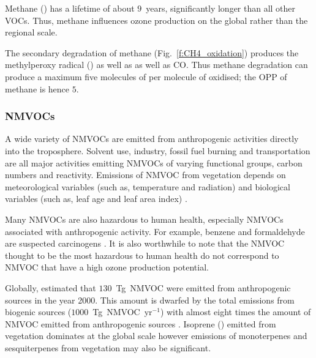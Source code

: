 Methane () has a lifetime of about $9$~years, significantly longer than all other VOCs.
Thus, methane influences ozone production on the global rather than the regional scale.  

The secondary degradation of methane (Fig.~\ref{f:CH4_oxidation}) produces the methylperoxy radical () as well as  as well as CO.
Thus methane degradation can produce a maximum five molecules of  per molecule of  oxidised; the OPP of methane is hence $5$.

\subsubsection{NMVOCs}
A wide variety of NMVOCs are emitted from anthropogenic activities directly into the troposphere.
Solvent use, industry, fossil fuel burning and transportation are all major activities emitting NMVOCs of varying functional groups, carbon numbers and reactivity.
Emissions of NMVOC from vegetation depends on meteorological variables (such as, temperature and radiation) and biological variables (such as, leaf age and leaf area index) \citep{Guenther:2012}.

Many NMVOCs are also hazardous to human health, especially NMVOCs associated with anthropogenic activity.
For example, benzene and formaldehyde are suspected carcinogens \citep{Laurent:2014}.
It is also worthwhile to note that the NMVOC thought to be the most hazardous to human health do not correspond to NMVOC that have a high ozone production potential.

Globally, \citet{Lamarque:2010} estimated that $130$~Tg~NMVOC were emitted from anthropogenic sources in the year 2000.
This amount is dwarfed by the total emissions from biogenic sources ($1000$~Tg~NMVOC~yr$^{-1}$) with almost eight times the amount of NMVOC emitted from anthropogenic sources \citep{Guenther:2012}.
Isoprene () emitted from vegetation dominates at the global scale however emissions of monoterpenes and sesquiterpenes from vegetation may also be significant.

